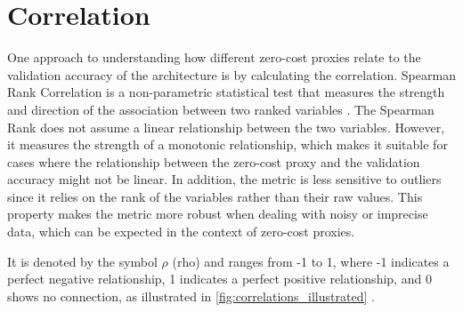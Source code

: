 \section{Correlation}\label{sec:corr}

One approach to understanding how different zero-cost proxies relate to the validation accuracy of the architecture is by calculating the correlation. Spearman Rank Correlation is a non-parametric statistical test that measures the strength and direction of the association between two ranked variables \autocite{hauke2011comparison}. The Spearman Rank does not assume a linear relationship between the two variables. However, it measures the strength of a monotonic relationship, which makes it suitable for cases where the relationship between the zero-cost proxy and the validation accuracy might not be linear. In addition, the metric is less sensitive to outliers since it relies on the rank of the variables rather than their raw values. This property makes the metric more robust when dealing with noisy or imprecise data, which can be expected in the context of zero-cost proxies. 

It is denoted by the symbol $\rho$ (rho) and ranges from -1 to 1, where -1 indicates a perfect negative relationship, 1 indicates a perfect positive relationship, and 0 shows no connection, as illustrated in \cref{fig:correlations_illustrated} \autocite{laerdstatistics}.  

